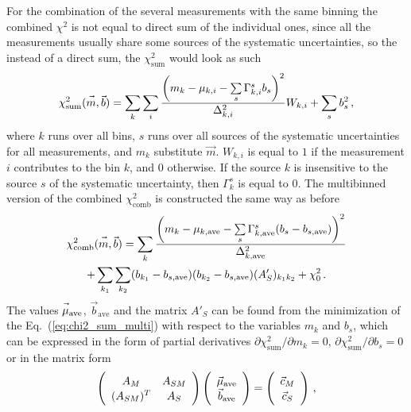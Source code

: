 For the combination of the several measurements with the same binning the combined $\chi^2$ is not equal to direct sum of the individual ones, since all the measurements usually share some sources of the systematic uncertainties, so the instead of a direct sum, the $\chi^2_\mathrm{sum}$ would look as such
\begin{equation}\label{eq:chi2_sum_multi}
\chi^2_\mathrm{sum}(\vec{\vphantom b\smash{m}},\vec{b}) = \sum\limits_k\sum\limits_i \frac{\left(m_k-\mu_{k,i} - \sum\limits_s \Gamma^s_{k,i} b_s\right)^2}{\Delta^2_{k,i}} W_{k,i}+\sum\limits_s b^2_s \,,
\end{equation}
where $k$ runs over all bins, $s$ runs over all sources of the systematic uncertainties for all measurements, and $m_k$ substitute $\vec{m}$. $W_{k,i}$ is equal to $1$ if the measurement $i$ contributes to the bin $k$, and $0$ otherwise. If the source $k$ is insensitive to the source $s$ of the systematic uncertainty, then $\Gamma^s_k$ is equal to $0$. The multibinned version of the combined $\chi^2_\mathrm{comb}$ is constructed the same way as before
\begin{equation}
\begin{gathered}
\chi^2_\mathrm{comb}(\vec{\vphantom b\smash{m}},\vec{b}) = \sum\limits_k\frac{\left(m_k-\mu_{k,\mathrm{ave}}-\sum\limits_s \Gamma^s_{k,\mathrm{ave}}(b_s - b_{s,\mathrm{ave}})\right)^2}{\Delta_{k,\mathrm{ave}}^2} \\
+ \sum\limits_{k_1} \sum\limits_{k_2} (b_{k_1} - b_{s,\mathrm{ave}})(b_{k_2} - b_{s,\mathrm{ave}})(A'_S)_{k_{1}k_{2}} + \chi^2_0\,.
\end{gathered}
\end{equation}
The values $\vec{\vphantom b\smash{\mu}}_\mathrm{ave}$, $\vec{b}_\mathrm{ave}$ and the matrix $A'_S$ can be found from the minimization of the Eq.~(\ref{eq:chi2_sum_multi}) with respect to the variables $m_k$ and $b_s$, which can be expressed in the form of partial derivatives $\partial\chi^2_\mathrm{sum}/\partial m_k = 0$, $\partial\chi^2_\mathrm{sum}/\partial b_s = 0$ or in the matrix form
\begin{equation}
\left( \begin{array}{cc} \vphantom{\vec{b}}  A_M & A_{SM} \\ \vphantom{\vec{b}}(A_{SM})^T & A_S \end{array} \right)
\left( \begin{array}{c}  \vphantom{\vec{b}}\vec{\mu}_\mathrm{ave} \\ \vec{b}_\mathrm{ave} \end{array} \right)
=
\left( \begin{array}{c} \vphantom{\vec{b}}\vec{c}_M \\ \vphantom{\vec{b}}\vec{c}_S \end{array} \right) \,,
\end{equation}
